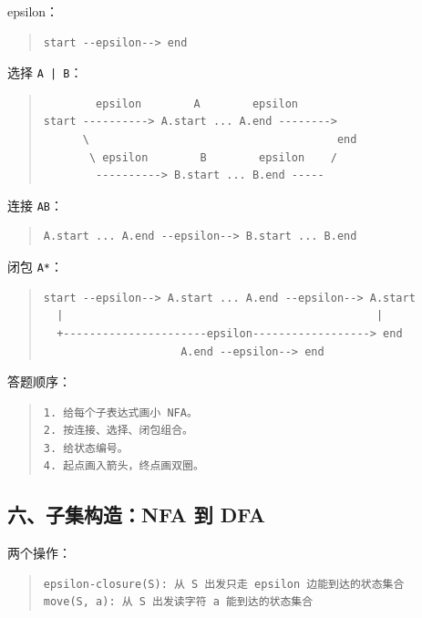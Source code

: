 \documentclass[UTF8,zihao=-4]{ctexart}
\begin{document}
epsilon：


\begin{quote}
\footnotesize
\begin{verbatim}
start --epsilon--> end
\end{verbatim}
\end{quote}


选择 \texttt{A | B}：


\begin{quote}
\footnotesize
\begin{verbatim}
        epsilon        A        epsilon
start ----------> A.start ... A.end -------->
      \                                      end
       \ epsilon        B        epsilon    /
        ----------> B.start ... B.end -----
\end{verbatim}
\end{quote}


连接 \texttt{AB}：


\begin{quote}
\footnotesize
\begin{verbatim}
A.start ... A.end --epsilon--> B.start ... B.end
\end{verbatim}
\end{quote}


闭包 \texttt{A*}：


\begin{quote}
\footnotesize
\begin{verbatim}
start --epsilon--> A.start ... A.end --epsilon--> A.start
  |                                                |
  +----------------------epsilon------------------> end
                     A.end --epsilon--> end
\end{verbatim}
\end{quote}


答题顺序：


\begin{quote}
\footnotesize
\begin{verbatim}
1. 给每个子表达式画小 NFA。
2. 按连接、选择、闭包组合。
3. 给状态编号。
4. 起点画入箭头，终点画双圈。
\end{verbatim}
\end{quote}


\subsection{六、子集构造：NFA 到 DFA}


两个操作：


\begin{quote}
\footnotesize
\begin{verbatim}
epsilon-closure(S): 从 S 出发只走 epsilon 边能到达的状态集合
move(S, a): 从 S 出发读字符 a 能到达的状态集合
\end{verbatim}
\end{quote}
\end{document}
